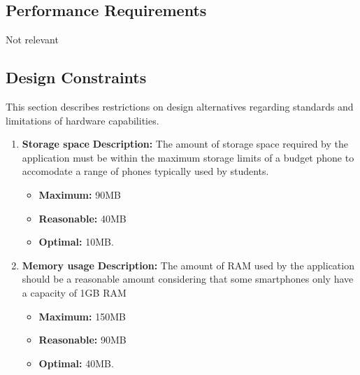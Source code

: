 \documentclass{article}
\begin{document}
	
	\subsection{Performance Requirements}
	Not relevant
	
	\subsection{Design Constraints}
	This section describes restrictions on design alternatives regarding standards and limitations of hardware capabilities.
	\begin{enumerate}
			\item \textbf{Storage space}\newline
			 \textbf{Description:} The amount of storage space required by the application must be within the maximum storage limits of a budget phone to accomodate a range of phones typically used by students.
			\begin{itemize}
			\item \textbf{Maximum:} 90MB
			\item \textbf{Reasonable:} 40MB
			\item \textbf{Optimal:} 10MB.\newline
			\end{itemize}
	
			\item \textbf{Memory usage}\newline
			\textbf{Description:} The amount of RAM used by the application should be a reasonable amount considering that some smartphones only have a capacity of 1GB RAM
			\begin{itemize}
			\item \textbf{Maximum:} 150MB
			\item \textbf{Reasonable:} 90MB
			\item \textbf{Optimal:} 40MB.\newline
			\end{itemize}
	\end{enumerate}
	
\end{document}
